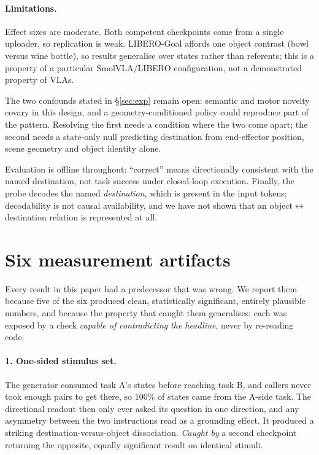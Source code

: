 \documentclass{article}
\begin{document}
\paragraph{Limitations.} Effect sizes are moderate. Both competent checkpoints come from a
single uploader, so replication is weak. LIBERO-Goal affords one object contrast
($\textrm{bowl}$ versus $\textrm{wine bottle}$), so results generalise over states rather than
referents; this is a property of a particular SmolVLA/LIBERO configuration, not a demonstrated
property of VLAs.

The two confounds stated in \S\ref{sec:exp} remain open: semantic and motor novelty covary in
this design, and a geometry-conditioned policy could reproduce part of the pattern. Resolving
the first needs a condition where the two come apart; the second needs a state-only null
predicting destination from end-effector position, scene geometry and object identity alone.

Evaluation is offline throughout: ``correct'' means directionally consistent with the named
destination, not task success under closed-loop execution. Finally, the probe decodes the named
\emph{destination}, which is present in the input tokens; decodability is not causal
availability, and we have not shown that an object$\leftrightarrow$destination relation is
represented at all.

\iflong
\section{Six measurement artifacts}
\label{sec:artifacts}

Every result in this paper had a predecessor that was wrong. We report them because five of the
six produced clean, statistically significant, entirely plausible numbers, and because the
property that caught them generalises: each was exposed by a check \emph{capable of
contradicting the headline}, never by re-reading code.

\paragraph{1. One-sided stimulus set.} The generator consumed task A's states before reaching
task B, and callers never took enough pairs to get there, so 100\% of states came from the
A-side task. The directional readout then only ever asked its question in one direction, and any
asymmetry between the two instructions read as a grounding effect. It produced a striking
destination-versus-object dissociation. \emph{Caught by} a second checkpoint returning the
opposite, equally significant result on identical stimuli.
\end{document}
